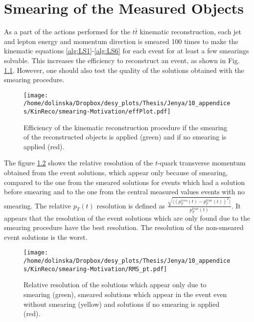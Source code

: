 \chapter{Smearing of the Measured Objects}\label{appendix:smear}

As a part of the actions performed for the $t\bar{t}$ kinematic reconstruction, each jet and lepton energy 
and momentum direction is smeared 100 times to make the kinematic equations \ref{alg:LS1}-\ref{alg:LS6} 
for each event for at least a few smearings solvable. This increases the efficiency to reconstruct an event,
as shown in Fig. \ref{fig:SmearEff}. However, one should also test the
quality of the solutions obtained with the smearing procedure.

\begin{figure}[h]
  \centering
  \texttt{[image: /home/dolinska/Dropbox/desy\_plots/Thesis/Jenya/10\_appendices/KinReco/smearing-Motivation/effPlot.pdf]}
  \caption{Efficiency of the kinematic reconstruction procedure if the smearing of the reconstructed objects is applied (green)
  and if no smearing is applied (red).}
  \label{fig:SmearEff}
\end{figure}

The figure \ref{fig:RMSsmear} shows the relative resolution of the $t$-quark transverse momentum obtained from the event solutions, 
which appear only because of smearing, compared to the one from the smeared solutions for events which had a solution before smearing and to the one
from the central measured values events with no smearing.
The relative $p_{T}(t)$ resolution is defined as $\frac{\sqrt{\langle (p_{T}^{reco}(t) - p_{T}^{true}(t))^{2} \rangle}}{p^{true}_{T}(t)}$.
It appears that the resolution of the event solutions which are only found
due to the smearing procedure have the best resolution. The resolution of the non-smeared event solutions is the worst.

\begin{figure}[t]
  \centering
  \texttt{[image: /home/dolinska/Dropbox/desy\_plots/Thesis/Jenya/10\_appendices/KinReco/smearing-Motivation/RMS\_pt.pdf]}
  \caption{Relative resolution of the solutions which appear only due to smearing (green), smeared solutions which appear in the 
  event even without smearing (yellow) and solutions if no smearing is applied (red).}
  \label{fig:RMSsmear}
\end{figure}

